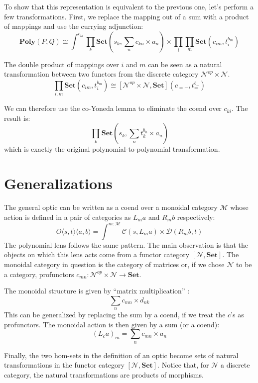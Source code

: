 \documentclass[11pt]{amsart}
\begin{document}
 
To show that this representation is equivalent to the previous one, let's perform a few transformations. First, we replace the mapping out of a sum with a product of mappings and use the currying adjunction:
\[ \mathbf{Poly}(P, Q) \cong \int^{c_{k i}} \prod_k  \mathbf{Set} \left(s_k, \sum_n c_{k n} \times a_n\right) \times  \prod_i  \prod_m \mathbf{Set} \left( c_{i m}, t_i^{b_m} \right) \]

 The double product of mappings over $i$ and $m$ can be seen as a natural transformation between two functors from the discrete category $\mathcal{N}^{op} \times \mathcal{N}$. 
  \[ \prod_{i, m}  \mathbf{Set} \left( c_{i m}, t_i^{b_m} \right) \cong [\mathcal{N}^{op} \times \mathcal{N}, \mathbf{Set}](c_{=-}, t_=^{b_{-}} )\]

 
 We can therefore use the co-Yoneda lemma to eliminate the coend over $c_{ki}$. The result is:
 \[ \prod_k \mathbf{Set}\left(s_k, \sum_n t_k^{b_n} \times a_n \right) \]
which is exactly the original polynomial-to-polynomial transformation.

\section{Generalizations}

The general optic can be written as a coend over a monoidal category $\mathcal{M}$ whose action is defined in a pair of categories as $L_m a$ and $R_m b$ respectively:
\[ O \langle s, t \rangle \langle a, b \rangle = \int^{m \colon \mathcal{M} } \mathcal{C} (s, L_m a) \times  \mathcal{D} (R_m b, t) \]
The polynomial lens follows the same pattern. The main observation is that the objects on which this lens acts come from a functor category $[\mathcal{N}, \mathbf{Set}]$. The monoidal category in question is the category of matrices or, if we chose $\mathcal{N}$ to be a category, profunctors $c_{m n} \colon \mathcal{N}^{op} \times \mathcal{N} \to \mathbf{Set}$.

The monoidal structure is given by ``matrix multiplication'' :
\[ \sum_n c_{m n} \times d_{n k} \]
This can be generalized by replacing the sum by a coend, if we treat the $c$'s as profunctors. The monoidal action is then given by a sum (or a coend):
\[ (L_{c} a)_m = \sum_n c_{m n} \times a_n \]

Finally, the two hom-sets in the definition of an optic become sets of natural transformations in the functor category $ [\mathcal{N}, \mathbf{Set}] $. Notice that, for $\mathcal{N}$ a discrete category, the natural transformations are products of morphisms.
\end{document}
